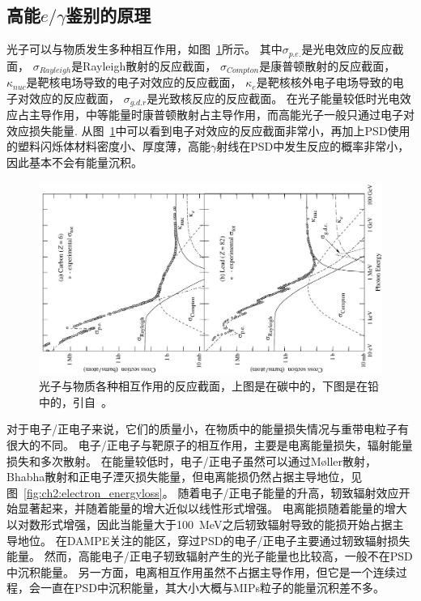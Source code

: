 \subsection{高能$e/\gamma$鉴别的原理}
光子可以与物质发生多种相互作用，如图~\ref{fig:ch2:photon_energyloss}所示。
其中${\sigma}_{p.e.}$是光电效应的反应截面，
${\sigma}_{Rayleigh}$是Rayleigh散射的反应截面， 
${\sigma}_{Compton}$是康普顿散射的反应截面，
${\kappa}_{nuc}$是靶核电场导致的电子对效应的反应截面，
${\kappa}_e$是靶核核外电子电场导致的电子对效应的反应截面，
${\sigma}_{g.d.r}$是光致核反应的反应截面。
在光子能量较低时光电效应占主导作用，中等能量时康普顿散射占主导作用，而高能光子一般只通过电子对效应损失能量.
从图~\ref{fig:ch2:photon_energyloss}中可以看到电子对效应的反应截面非常小，再加上PSD使用的塑料闪烁体材料密度小、厚度薄，高能$\gamma$射线在PSD中发生反应的概率非常小，因此基本不会有能量沉积。

\begin{figure}[t]
	\centering
	\includegraphics[width=0.9\linewidth,angle=270]{chap/description/fig/photon_energyloss}
	\caption{光子与物质各种相互作用的反应截面，上图是在碳中的，下图是在铅中的，引自~\parencite{pdg_book}。}
	\label{fig:ch2:photon_energyloss}
\end{figure}

对于电子/正电子来说，它们的质量小，在物质中的能量损失情况与重带电粒子有很大的不同。
电子/正电子与靶原子的相互作用，主要是电离能量损失，辐射能量损失和多次散射。
在能量较低时，电子/正电子虽然可以通过Møller散射，Bhabha散射和正电子湮灭损失能量，但电离能损仍然占据主导地位，见图~\ref{fig:ch2:electron_energyloss}。
随着电子/正电子能量的升高，轫致辐射效应开始显著起来，并随着能量的增大近似以线性形式增强。
电离能损随着能量的增大以对数形式增强，因此当能量大于\SI{100}{MeV}之后轫致辐射导致的能损开始占据主导地位。
在DAMPE关注的能区，穿过PSD的电子/正电子主要通过轫致辐射损失能量。
然而，高能电子/正电子轫致辐射产生的光子能量也比较高，一般不在PSD中沉积能量。
另一方面，电离相互作用虽然不占据主导作用，但它是一个连续过程，会一直在PSD中沉积能量，其大小大概与MIPs粒子的能量沉积差不多。

